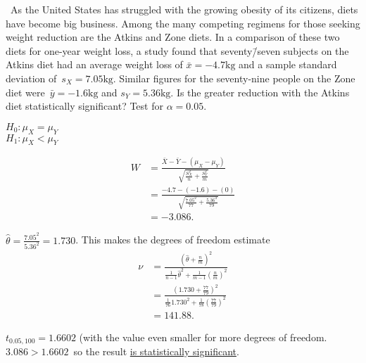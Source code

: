 \begin{problem}
  ~As the United States has struggled with the growing obesity of its citizens, diets have become big business. Among the many competing regimens for those seeking weight reduction are the Atkins and Zone diets. In a comparison of these two diets for one-year weight loss, a study found that seventy\=/seven subjects on the Atkins diet had an average weight loss of ${\bar{x} = -4.7\text{kg}}$ and a sample standard deviation of~${s_X =7.05\text{kg}}$. Similar figures for the seventy-nine people on the Zone diet were~${\bar{y} = -1.6\text{kg}}$ and ${s_Y = 5.36\text{kg}}$. Is the greater reduction with the Atkins diet statistically significant? Test for ${\alpha = 0.05}$.
\end{problem}

\noindent
${H_0: \mu_{X} = \mu_{Y}}$ \\
${H_1: \mu_{X} < \mu_{Y}}$

\begin{align}
  W &= \frac{\bar{X} - \bar{Y} - (\mu_{X} - \mu_{Y})}{\sqrt{\frac{S_{X}^{2}}{n} + \frac{S_{Y}^{2}}{m}}} \\
    &= \frac{-4.7 - (-1.6) - (0)}{\sqrt{\frac{7.05^2}{77}+\frac{5.36^2}{79}}} \\
    &= -3.086\text{.}
\end{align}

\noindent
${\hat{\theta} = \frac{7.05^2}{5.36^2} = 1.730}$.  This makes the degrees of freedom estimate
\begin{align}
  \nu &= \frac{(\hat{\theta} + \frac{n}{m})^2}{\frac{1}{n-1}\hat{\theta}^2 + \frac{1}{m-1}\left(\frac{n}{m}\right)^2} \\
      &= \frac{\left(1.730 + \frac{77}{79}\right)^2}{\frac{1}{76} 1.730^2 + \frac{1}{78}\left(\frac{77}{79}\right)^2} \\
      &= 141.88 \text{.}
\end{align}

\noindent
${t_{0.05,100} = 1.6602}$ (with the value even smaller for more degrees of freedom.  ${3.086 > 1.6602}$~so  the result \underline{is statistically significant}.
